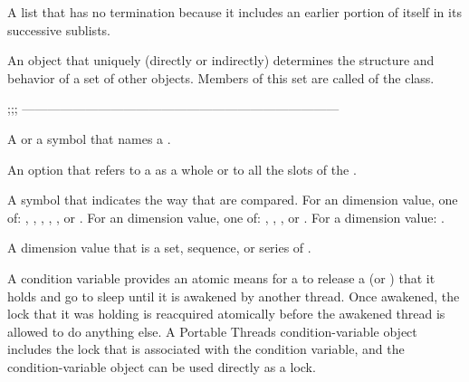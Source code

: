 \begin{glossary-list}
%
%
A list that has no termination because it includes an earlier portion of
itself in its successive sublists.


\glent[class]
%
%
%
An object that uniquely (directly or indirectly) determines the structure and
behavior of a set of other objects. Members of this set are called
 of the class.

;;; ---------------------------------------------------------------------------

%
%
%
%
A  or a symbol that names a .


%
%
An option that refers to a  as a whole or to all the slots of the
.


%
%
%
%
%
%
%
%
%
%
%
%
%
%
A symbol that indicates the way that  are compared.
For an  dimension value, one of: ,
, , , ,
or .  For an  dimension value, one of:
, , , or .  For a 
dimension value: .


% 
%
A dimension value that is a set, sequence, or series of
.


%
%
% 
%
A condition variable provides an atomic means for a  to release
a  (or ) that it holds and go to sleep until
it is awakened by another thread.  Once awakened, the lock that it was holding
is reacquired atomically before the awakened thread is allowed to do anything
else.  A Portable Threads condition-variable object includes the lock that is
associated with the condition variable, and the condition-variable object can
be used directly as a lock.


\end{glossary-list}

